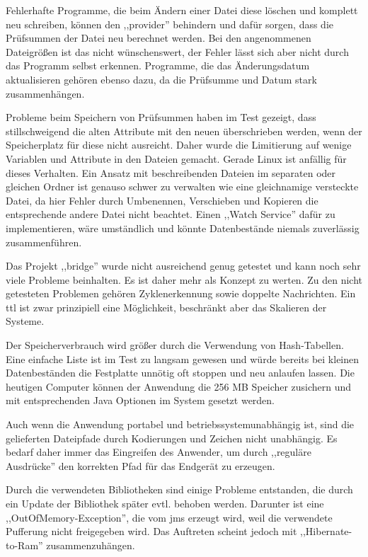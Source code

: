 \documentclass[oneside, ngerman, toc=bibliography,bibliography=totoc,listof=entryprefix, open=right,numbers=noenddot,fontsize=12pt]{scrbook}
\begin{document}
Fehlerhafte Programme, die beim Ändern einer Datei diese löschen und komplett neu schreiben, können den ,,provider'' behindern und dafür sorgen, dass die Prüfsummen der Datei neu berechnet werden. Bei den angenommenen Dateigrößen ist das nicht wünschenswert, der Fehler lässt sich aber nicht durch das Programm selbst erkennen. Programme, die das Änderungsdatum aktualisieren gehören ebenso dazu, da die Prüfsumme und Datum stark zusammenhängen.

Probleme beim Speichern von Prüfsummen haben im Test gezeigt, dass stillschweigend die alten Attribute mit den neuen überschrieben werden, wenn der Speicherplatz für diese nicht ausreicht. Daher wurde die Limitierung auf wenige Variablen und Attribute in den Dateien gemacht. Gerade Linux ist anfällig für dieses Verhalten.
Ein Ansatz mit beschreibenden Dateien im separaten oder gleichen Ordner ist genauso schwer zu verwalten wie eine gleichnamige versteckte Datei, da hier Fehler durch Umbenennen, Verschieben und Kopieren die entsprechende andere Datei nicht beachtet. Einen ,,Watch Service'' dafür zu implementieren, wäre umständlich und könnte Datenbestände niemals zuverlässig zusammenführen.

Das Projekt ,,bridge'' wurde nicht ausreichend genug getestet und kann noch sehr viele Probleme beinhalten. Es ist daher mehr als Konzept zu werten. Zu den nicht getesteten Problemen gehören Zyklenerkennung sowie doppelte Nachrichten. Ein \acrshort{ttl} ist zwar prinzipiell eine Möglichkeit, beschränkt aber das Skalieren der Systeme.

Der Speicherverbrauch wird größer durch die Verwendung von Hash-Tabellen. Eine einfache Liste ist im Test zu langsam gewesen und würde bereits bei kleinen Datenbeständen die Festplatte unnötig oft stoppen und neu anlaufen lassen. Die heutigen Computer können der Anwendung die 256 MB Speicher zusichern und mit entsprechenden Java Optionen im System gesetzt werden.

Auch wenn die Anwendung portabel und betriebssystemunabhängig ist, sind die gelieferten Dateipfade durch Kodierungen und Zeichen nicht unabhängig. Es bedarf daher immer das Eingreifen des Anwender, um durch ,,reguläre Ausdrücke'' den korrekten Pfad für das Endgerät zu erzeugen.

Durch die verwendeten Bibliotheken sind einige Probleme entstanden, die durch ein Update der Bibliothek später evtl. behoben werden. Darunter ist eine ,,OutOfMemory-Exception'', die vom \acrshort{jms} erzeugt wird, weil die verwendete Pufferung nicht freigegeben wird. Das Auftreten scheint jedoch mit ,,Hibernate-to-Ram'' zusammenzuhängen. 
\end{document}
